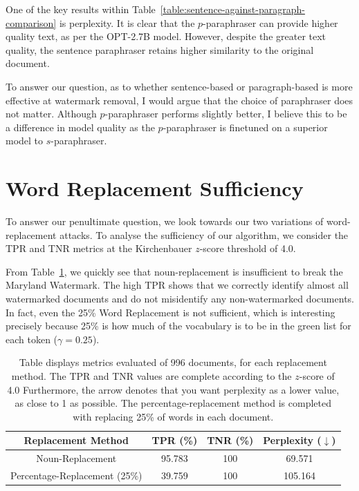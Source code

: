 \documentclass{l4proj}
\theoremstyle{definition}
\newcommand{\codefont}[1]{{\fontfamily{lmtt}\selectfont #1}}
\begin{document}
    One of the key results within Table~\ref{table:sentence-against-paragraph-comparison} is perplexity. It is clear that the $p$-paraphraser can provide higher quality text, as per the \codefont{OPT-2.7B} model. However, despite the greater text quality, the sentence paraphraser retains higher similarity to the original document.

    To answer our question, as to whether sentence-based or paragraph-based is more effective at watermark removal, I would argue that the choice of paraphraser does not matter. Although $p$-paraphraser performs slightly better, I believe this to be a difference in model quality as the $p$-paraphraser is finetuned on a superior model to $s$-paraphraser.

\section{Word Replacement Sufficiency}
    To answer our penultimate question, we look towards our two variations of word-replacement attacks. To analyse the sufficiency of our algorithm, we consider the TPR and TNR metrics at the Kirchenbauer $z$-score threshold of 4.0.

    From Table~\ref{table:word-replacement-comparison}, we quickly see that noun-replacement is insufficient to break the Maryland Watermark. The high TPR shows that we correctly identify almost all watermarked documents and do not misidentify any non-watermarked documents. In fact, even the 25\% Word Replacement is not sufficient, which is interesting precisely because 25\% is how much of the vocabulary is to be in the green list for each token ($\gamma = 0.25$). 

    \begin{table}[ht]
        \centering
        \begin{tabular}{c|c|c|c}
            Replacement Method & TPR (\%) & TNR (\%) & Perplexity ($\downarrow$) \\ \hline
            Noun-Replacement & 95.783 & 100 & 69.571 \\
            Percentage-Replacement (25\%) & 39.759 & 100 & 105.164
        \end{tabular}
        \caption{Table displays metrics evaluated of 996 documents, for each replacement method. The TPR and TNR values are complete according to the $z$-score of 4.0 Furthermore, the arrow denotes that you want perplexity as a lower value, as close to 1 as possible. The percentage-replacement method is completed with replacing 25\% of words in each document.}
        \label{table:word-replacement-comparison}
    \end{table}
\end{document}
